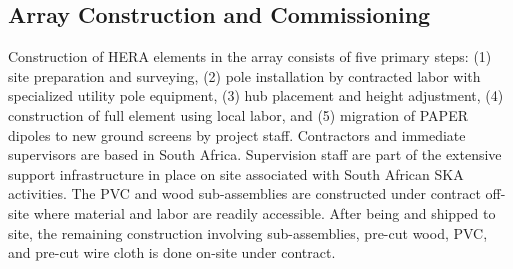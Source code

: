\documentclass[preprint]{aastex}
\newcommand{\compress}{\vspace{-0.25in}}
\begin{document}
\compress
\subsection{Array Construction and Commissioning}

Construction of HERA elements in the array consists of five primary steps: 
(1) site preparation and surveying, (2) pole installation by contracted labor with specialized utility pole equipment,
(3) hub placement and height adjustment, (4) construction of full element using local labor,
and (5) migration of PAPER dipoles to new ground screens by project staff.
Contractors and immediate supervisors are based in South Africa.  Supervision staff 
are part of the extensive support infrastructure in place on site associated with South African SKA activities.
The PVC and wood sub-assemblies 
are constructed under contract off-site where material and labor are readily accessible.  After being and shipped to site, the
remaining construction involving sub-assemblies, pre-cut wood, PVC, and pre-cut wire cloth 
is done on-site under contract.  


\end{document}
